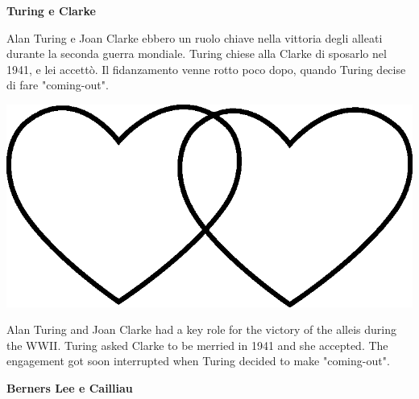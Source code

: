 \documentclass[11pt]{extarticle}
\begin{document}
\vspace*{\fill}
\newpage
\begin{center}
\vspace*{\fill}
{\Huge \textbf{Turing e Clarke\\}}
\vspace*{\fill}
\end{center}
\newpage
{}
\vspace*{\fill}
\begin{center}
Alan Turing e Joan Clarke ebbero un ruolo chiave nella vittoria degli alleati durante la seconda guerra mondiale. Turing chiese alla Clarke di sposarlo nel 1941, e lei accettò. Il fidanzamento venne rotto poco dopo, quando Turing decise di fare "coming-out".\\
\begin{center}
\includegraphics[scale=0.1]{img/cuori_venn.eps}\\
\end{center}
\end{center}
\begin{center}
Alan Turing and Joan Clarke had a key role for the victory of the alleis during the WWII. Turing asked Clarke to be merried in 1941 and she accepted. The engagement got soon interrupted when Turing decided to make "coming-out".\\
\end{center}
\vspace*{\fill}
\newpage
\begin{center}
\vspace*{\fill}
{\Huge \textbf{Berners Lee e Cailliau\\}}
\vspace*{\fill}
\end{center}
\end{document}
